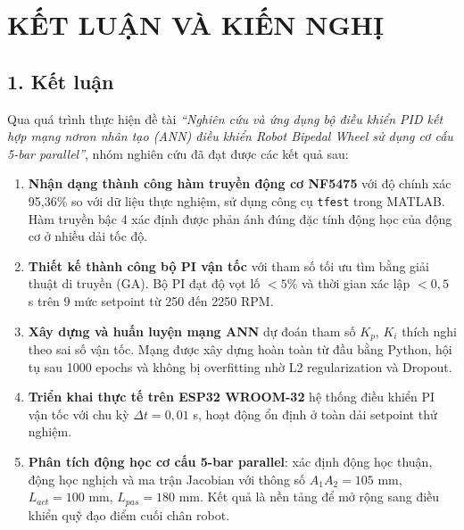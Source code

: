 
\chapter*{KẾT LUẬN VÀ KIẾN NGHỊ}
\label{chap:ketluan}


\section*{1. Kết luận}

Qua quá trình thực hiện đề tài \textit{``Nghiên cứu và ứng dụng bộ điều khiển PID
kết hợp mạng nơron nhân tạo (ANN) điều khiển Robot Bipedal Wheel sử dụng cơ cấu
5-bar parallel''}, nhóm nghiên cứu đã đạt được các kết quả sau:

\begin{enumerate}[leftmargin=1.5cm, label=\arabic*.]
    \item \textbf{Nhận dạng thành công hàm truyền động cơ NF5475} với độ chính xác
    95,36\% so với dữ liệu thực nghiệm, sử dụng công cụ \texttt{tfest} trong MATLAB.
    Hàm truyền bậc 4 xác định được phản ánh đúng đặc tính động học của động cơ
    ở nhiều dải tốc độ.

    \item \textbf{Thiết kế thành công bộ PI vận tốc} với tham số tối ưu tìm bằng
    giải thuật di truyền (GA). Bộ PI đạt độ vọt lố $< 5\%$ và thời gian xác lập
    $< 0{,}5$ s trên 9 mức setpoint từ 250 đến 2250 RPM.

    \item \textbf{Xây dựng và huấn luyện mạng ANN} dự đoán tham số $K_p$, $K_i$
    thích nghi theo sai số vận tốc. Mạng được xây dựng hoàn toàn từ đầu bằng Python,
    hội tụ sau 1000 epochs và không bị overfitting nhờ L2 regularization và Dropout.

    \item \textbf{Triển khai thực tế trên ESP32 WROOM-32} hệ thống điều khiển PI
    vận tốc với chu kỳ $\Delta t = 0{,}01$ s, hoạt động ổn định ở toàn dải setpoint
    thử nghiệm.

    \item \textbf{Phân tích động học cơ cấu 5-bar parallel}: xác định động học thuận,
    động học nghịch và ma trận Jacobian với thông số $A_1A_2 = 105$ mm,
    $L_{act} = 100$ mm, $L_{pas} = 180$ mm. Kết quả là nền tảng để mở rộng
    sang điều khiển quỹ đạo điểm cuối chân robot.
\end{enumerate}

